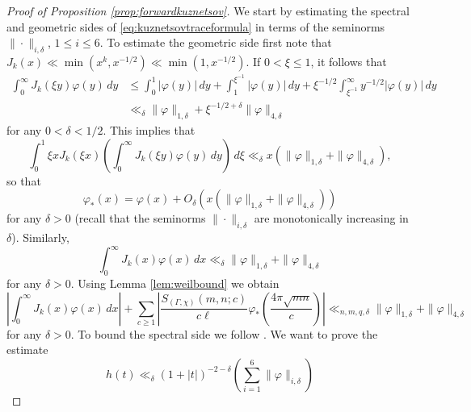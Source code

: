 \documentclass{article}
\theoremstyle{named}
\begin{document}
\begin{proof}[Proof of Proposition \ref{prop:forwardkuznetsov}]
We start by estimating the spectral and geometric sides of \eqref{eq:kuznetsovtraceformula} in terms of the seminorms $\|\cdot\|_{i, \delta}$, $1 \leq i\leq 6$. To estimate the geometric side first note that $J_k(x) \ll \min(x^k, x^{-1/2}) \ll \min(1, x^{-1/2})$. If $0 < \xi \leq 1$, it follows that 
\begin{equation*}
\begin{aligned}
    \int_0^\infty J_k(\xi y)\varphi(y) \, dy &  \leq \int_0^1 |\varphi(y)| \,dy + \int_1^{\xi^{-1}} |\varphi(y)|\, dy + \xi^{-1/2}\int_{\xi^{-1}}^\infty y^{-1/2}|\varphi(y)| \, dy\\
    & \ll_\delta \|\varphi\|_{1, \delta} + \xi^{-1/2 + \delta}\|\varphi\|_{4, \delta}
\end{aligned}
\end{equation*}
for any $0< \delta < 1/2$. This implies that
\begin{equation*}
    \int_0^1 \xi x J_k(\xi x)\left(\int_0^\infty J_k(\xi y)\varphi(y) \, dy\right)\, d\xi \ll_\delta x \left(\|\varphi\|_{1, \delta} + \|\varphi\|_{4, \delta}\right),
\end{equation*}
so that 
\begin{equation*}
    \varphi_*(x) = \varphi(x) + O_\delta\left(x(\|\varphi\|_{1, \delta} + \|\varphi\|_{4, \delta})\right)
\end{equation*}
for any $\delta > 0$ (recall that the seminorms $\|\cdot\|_{i, \delta}$ are monotonically increasing in $\delta$). Similarly, 
\begin{equation*}
\int_0^\infty J_k(x)\varphi(x) \, dx \ll_{\delta}  \|\varphi\|_{1, \delta} +  \|\varphi\|_{4, \delta}
\end{equation*}
for any $\delta > 0$. Using Lemma \ref{lem:weilbound} we obtain 
\begin{equation}\label{eq:apriorigeometricbound}
     \left|\int_0^\infty J_k(x)\varphi(x) \, dx \right| + \sum_{c \geq 1}\left|\frac{S_{(\Gamma, \chi)}(m, n; c)}{c\ell}\varphi_*\left(\frac{4\pi\sqrt{m n}}{c }\right)\right| \ll_{n, m, q, \delta}  \|\varphi\|_{1, \delta} + \|\varphi\|_{4, \delta}
\end{equation}
for any $\delta > 0$. To bound the spectral side we follow \cite{proskurinsummationformulas}. We want to prove the estimate
\begin{equation}\label{eq:estimatehfunction}
    h(t) \ll_\delta (1 + |t|)^{-2-\delta} \left(\sum_{i = 1}^6 \|\varphi\|_{i, \delta}\right)
\end{equation}

\end{proof}
\end{document}
